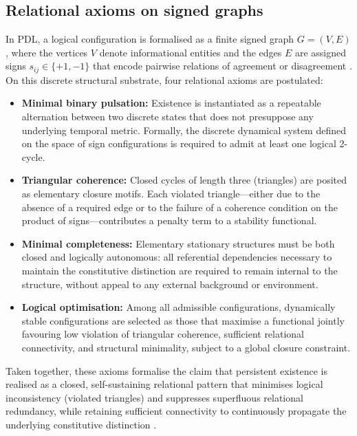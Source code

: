 \documentclass[11pt,a4paper]{article}
\begin{document}
\subsection{Relational axioms on signed graphs}
\label{subsec:axioms}

In PDL, a logical configuration is formalised as a finite signed graph \(G = (V, E)\), where the vertices \(V\) denote informational entities and the edges \(E\) are assigned signs \(s_{ij} \in \{+1, -1\}\) that encode pairwise relations of agreement or disagreement \citep{PDL_Main_2026,PDL_intro}. On this discrete structural substrate, four relational axioms are postulated:

\begin{itemize}[leftmargin=1.5em]
  \item \textbf{Minimal binary pulsation:} Existence is instantiated as a repeatable alternation between two discrete states that does not presuppose any underlying temporal metric. Formally, the discrete dynamical system defined on the space of sign configurations is required to admit at least one logical 2-cycle.

  \item \textbf{Triangular coherence:} Closed cycles of length three (triangles) are posited as elementary closure motifs. Each violated triangle—either due to the absence of a required edge or to the failure of a coherence condition on the product of signs—contributes a penalty term to a stability functional.

  \item \textbf{Minimal completeness:} Elementary stationary structures must be both closed and logically autonomous: all referential dependencies necessary to maintain the constitutive distinction are required to remain internal to the structure, without appeal to any external background or environment.

  \item \textbf{Logical optimisation:} Among all admissible configurations, dynamically stable configurations are selected as those that maximise a functional jointly favouring low violation of triangular coherence, sufficient relational connectivity, and structural minimality, subject to a global closure constraint.
\end{itemize}

Taken together, these axioms formalise the claim that persistent existence is realised as a closed, self-sustaining relational pattern that minimises logical inconsistency (violated triangles) and suppresses superfluous relational redundancy, while retaining sufficient connectivity to continuously propagate the underlying constitutive distinction \citep{PDL_Main_2026,PDL_position}.
\end{document}
